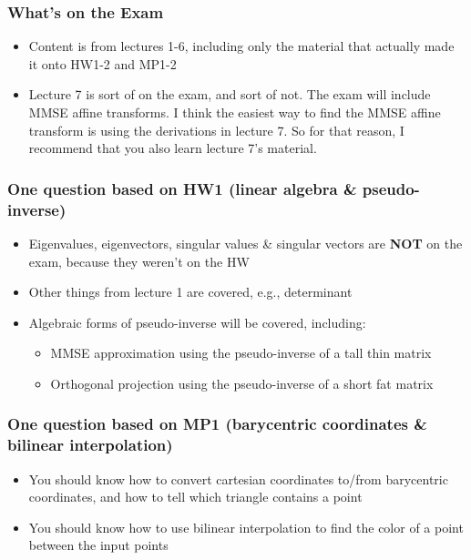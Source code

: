 \documentclass{beamer}
\begin{document}
\begin{frame}
  \frametitle{What's on the Exam}

  \begin{itemize}
  \item Content is from lectures 1-6, including only the material that
    actually made it onto HW1-2 and MP1-2
  \item Lecture 7 is sort of on the exam, and sort of not.  The exam
    will include MMSE affine transforms.  I think the easiest way to
    find the MMSE affine transform is using the derivations in lecture
    7.  So for that reason, I recommend that you also learn lecture
    7's material.
  \end{itemize}
\end{frame}

\begin{frame}
  \frametitle{One question based on HW1 (linear algebra \& pseudo-inverse)}

  \begin{itemize}
  \item Eigenvalues, eigenvectors, singular values \& singular vectors are \textbf{NOT} on the exam,
    because they weren't on the HW
  \item Other things from lecture 1 are covered, e.g., determinant
  \item Algebraic forms of pseudo-inverse will be covered, including:
    \begin{itemize}
    \item MMSE approximation using the pseudo-inverse of a tall thin matrix
    \item Orthogonal projection using the pseudo-inverse of a short fat matrix
    \end{itemize}
  \end{itemize}
\end{frame}

\begin{frame}
  \frametitle{One question based on MP1 (barycentric coordinates \& bilinear interpolation)}

  \begin{itemize}
  \item You should know how to convert cartesian coordinates to/from barycentric coordinates,
    and how to tell which triangle contains a point
  \item You should know how to use bilinear interpolation to find the
    color of a point between the input points
  \end{itemize}
\end{frame}
\end{document}

